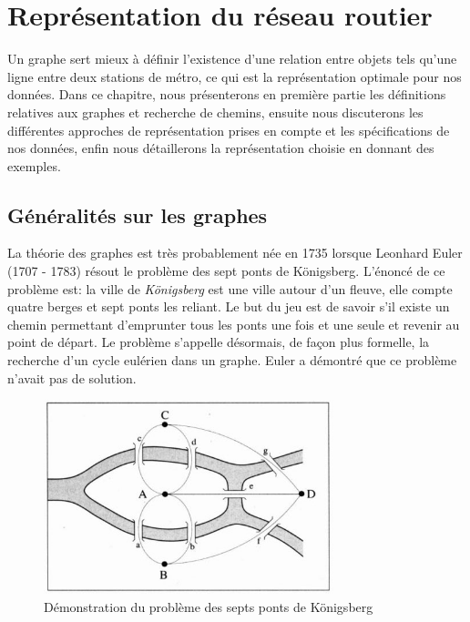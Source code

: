 \chapter{Représentation du réseau routier}
Un graphe sert mieux à définir l'existence d'une relation entre objets tels qu'une ligne entre deux stations de métro, ce qui est la représentation optimale pour nos données. Dans ce chapitre, nous présenterons en première partie les définitions relatives aux graphes et recherche de chemins, ensuite nous discuterons les différentes approches de représentation prises en compte et les spécifications de nos données, enfin nous détaillerons la représentation choisie en donnant des exemples.

\section{Généralités sur les graphes}
La théorie des graphes est très probablement née en 1735 lorsque Leonhard Euler (1707 - 1783) résout le problème des sept ponts de Königsberg. 
L'énoncé de ce problème est: la ville de \emph{Königsberg} est une ville autour d'un fleuve, elle compte quatre berges et sept ponts les reliant. Le but du jeu est de savoir s'il existe un chemin permettant d'emprunter tous les ponts une fois et une seule et revenir au point de départ. Le problème s'appelle désormais, de façon plus formelle, la recherche d'un cycle eulérien dans un graphe. Euler a démontré que ce problème n'avait pas de solution.

\begin{figure}[h!]
\center
\includegraphics[width=0.75\textwidth]{img/Bridges.jpg}
\caption{Démonstration du problème des septs ponts de Königsberg}
\end{figure}

